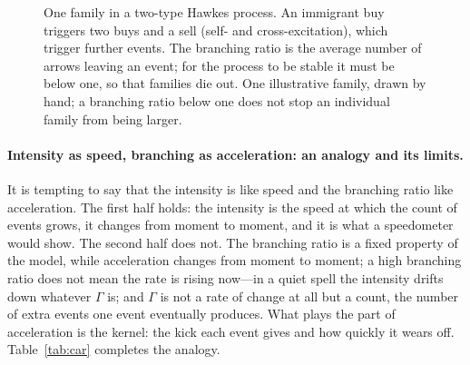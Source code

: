 \begin{figure}[!htbp]
\centering
{}
\caption{One family in a two-type Hawkes process. An immigrant buy triggers two buys and a sell
(self- and cross-excitation), which trigger further events. The branching ratio is the average number of arrows
leaving an event; for the process to be stable it must be below one, so that families die out. One illustrative
family, drawn by hand; a branching ratio below one does not stop an individual family from being larger.}
\label{fig:family-tree}
\end{figure}

\paragraph{Intensity as speed, branching as acceleration: an analogy and its limits.} It is tempting to say that the intensity is like speed and the
branching ratio like acceleration. The first half holds: the intensity is the speed at which the count of events
grows, it changes from moment to moment, and it is what a speedometer would show. The second half does not. The
branching ratio is a fixed property of the model, while acceleration changes from moment to moment; a high
branching ratio does not mean the rate is rising now---in a quiet spell the intensity drifts down whatever
$\Gamma$ is; and $\Gamma$ is not a rate of change at all but a count, the number of extra events one event
eventually produces. What plays the part of acceleration is the kernel: the kick each event gives and how quickly
it wears off. Table~\ref{tab:car} completes the analogy.

